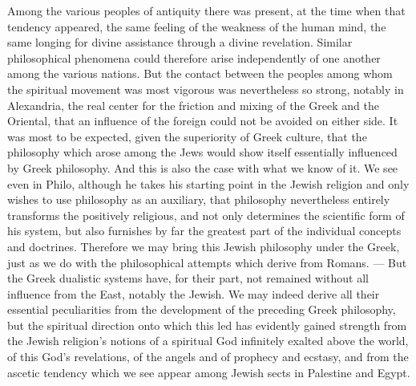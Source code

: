 Among the various peoples of antiquity there was present, at the time when
that tendency appeared, the same feeling of the weakness of the human mind, the same longing for divine assistance through a divine revelation. Similar philosophical phenomena could therefore arise independently of
one another among the various nations. But the contact between the peoples among whom the spiritual movement was most vigorous was nevertheless so strong, notably in Alexandria,
the real center for the friction and mixing of the
Greek and the Oriental, that an influence of the foreign
could not be avoided on either side. It was most
to be expected, given the superiority of Greek culture, that the philosophy which arose among the Jews would show itself essentially
influenced by Greek philosophy. And this is also the case with what we know of it. We see even in Philo, although
he takes his starting point in the Jewish religion and only
wishes to use philosophy as an auxiliary, that philosophy nevertheless
entirely transforms the positively religious, and not only determines
the scientific form of his system, but also furnishes by far
the greatest part of the individual concepts and doctrines.
Therefore we may bring this Jewish philosophy under
the Greek, just as we do with the philosophical attempts
which derive from Romans. --- But the Greek dualistic systems have, for their part, not remained without all influence from the
East, notably the Jewish. We may indeed derive all
their essential peculiarities from the development of the preceding Greek
philosophy, but the spiritual direction onto which
this led has evidently gained strength from the Jewish
religion's notions of a spiritual God infinitely exalted above the world, of this God's revelations, of the angels and
of prophecy and ecstasy, and from the ascetic tendency
which we see appear among Jewish sects in Palestine and Egypt.

\divrule

